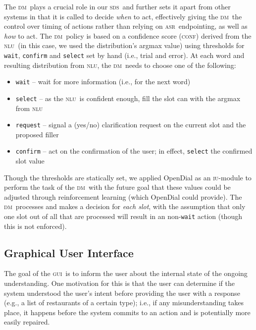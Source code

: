 \documentclass[11pt]{article}
\newcommand{\sds}[0]{\textsc{sds}}
\newcommand{\nlu}[0]{\textsc{nlu}}
\newcommand{\asr}[0]{\textsc{asr}}
\newcommand{\dm}[0]{\textsc{dm}}
\newcommand{\ui}[0]{\textsc{gui}}
\newcommand{\iu}[0]{\textsc{iu}}
\newcommand{\conf}[0]{\textsc{conf}}
\begin{document}
The \dm\ plays a crucial role in our \sds\ and further sets it apart from other systems in that it is called to decide \emph{when} to act, effectively giving the \dm\ the control over timing of actions rather than relying on \asr\ endpointing, as well as \emph{how} to act. The \dm\ policy is based on a confidence score (\conf) derived from the \nlu\ (in this case, we used the distribution's argmax value) using thresholds for \texttt{wait}, \texttt{confirm} and \texttt{select} set by hand (i.e., trial and error). At each word and resulting distribution from \nlu, the \dm\ needs to choose one of the following:
\begin{itemize}
 \item \texttt{wait} -- wait for more information (i.e., for the next word) %
 \item \texttt{select} -- as the \nlu\ is confident enough, fill the slot can with the argmax from \nlu %
 \item \texttt{request} -- signal a (yes/no) clarification request on the current slot and the proposed filler%
 \item \texttt{confirm} -- act on the confirmation of the user; in effect, \texttt{select} the confirmed slot value%
\end{itemize}

Though the thresholds are statically set, we applied OpenDial \cite{Lison2015a} as an \iu-module to perform the task of the \dm\ with the future goal that these values could be adjusted through reinforcement learning (which OpenDial could provide). The \dm\ processes and makes a decision for \emph{each slot}, with the assumption that only one slot out of all that are processed will result in an non-\texttt{wait} action (though this is not enforced). 



\subsection{Graphical User Interface}
\label{section:display}

The goal of the \ui\ is to inform the user about the internal state of the ongoing understanding. One motivation for this is that the user can determine if the system understood the user's intent before providing the user with a response (e.g., a list of restaurants of a certain type); i.e., if any misunderstanding takes place, it happens before the system commits to an action and is potentially more easily repaired. 
\end{document}
